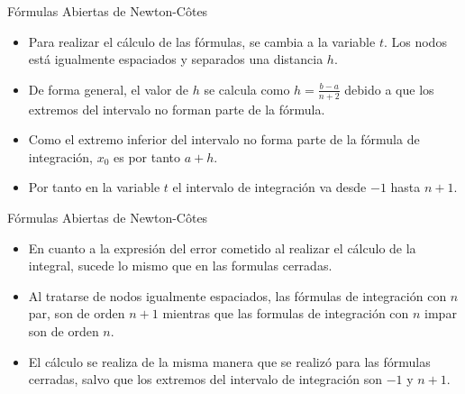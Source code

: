 \documentclass[12pt]{beamer}
\begin{document}
\begin{frame}{F\'ormulas Abiertas de Newton-C\^otes}
  \begin{itemize}
    \item Para realizar el cálculo de las fórmulas, se cambia a la variable $t$. Los nodos está igualmente espaciados y
    separados una distancia $h$.
    \item<2-> De forma general, el valor de $h$ se calcula como $h=\frac{b-a}{n+2}$ debido a que los extremos del intervalo no forman parte de la fórmula.
    \item<3-> Como el extremo inferior del intervalo no forma parte de la fórmula de integración, $x_0$ es por tanto $a + h$.
    \item<4-> Por tanto en la variable $t$ el intervalo de integración va desde $-1$ hasta $n+1$.
  \end{itemize}
  \begin{center}  
\end{center}
\end{frame}
\begin{frame}{F\'ormulas Abiertas de Newton-C\^otes}
  \begin{itemize}
    \item En cuanto a la expresión del error cometido al realizar el cálculo de la integral, sucede lo mismo que en las
    formulas cerradas.
    \item Al tratarse de nodos igualmente espaciados, las fórmulas de integración con $n$ par, son de orden $n+1$ mientras que las formulas de integración con $n$ impar son de orden $n$.
    \item El cálculo se realiza de la
    misma manera que se realizó para las fórmulas cerradas, salvo que los extremos del intervalo de integración
    son $-1$ y $n+1$.
    \end{itemize}
\end{frame}
\end{document}
